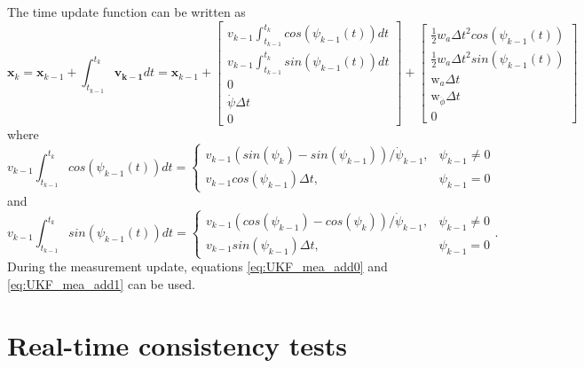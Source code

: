 \documentclass[12pt]{article}
\begin{document}
The time update function can be written as
\begin{equation}
	\mathbf{x}_{k} = 
	\mathbf{x}_{k-1} + \int_{t_{k-1}}^{t_k} {\mathbf{v_{k-1}}dt} 
	= \mathbf{x}_{k-1} + 
	\begin{bmatrix} 
		v_{k-1}\int_{t_{k-1}}^{t_k} cos(\psi_{k-1}(t))dt \\
		v_{k-1}\int_{t_{k-1}}^{t_k} sin(\psi_{k-1}(t)) dt \\ 
		0 \\ 
		\dot{\psi}\Delta t \\ 
		0 
	\end{bmatrix} +
	\begin{bmatrix} \frac{1}{2}w_a\Delta t^2cos(\psi_{k-1}(t)) \\
	                \frac{1}{2}w_a\Delta t^2sin(\psi_{k-1}(t)) \\
	                \text{w}_a\Delta t \\
	                \text{w}_{\ddot{\phi}} \Delta t \\
	                0
	                \end{bmatrix}
\end{equation}
%
where
%
\begin{equation}
	v_{k-1}\int_{t_{k-1}}^{t_k} cos(\psi_{k-1}(t)) dt =
	\begin{cases}
	  v_{k-1}(sin(\psi_k) - sin(\psi_{k-1}))/\dot{\psi}_{k-1}, & \psi_{k-1} \neq 0 \\
	  v_{k-1}cos(\psi_{k-1})\Delta t, &\psi_{k-1} = 0
	\end{cases}
\end{equation}
and
\begin{equation}
	v_{k-1}\int_{t_{k-1}}^{t_k} sin(\psi_{k-1}(t)) dt =
	\begin{cases}
	  v_{k-1}(cos(\psi_{k-1}) - cos(\psi_{k}))/\dot{\psi}_{k-1}, & \psi_{k-1} \neq 0 \\
	  v_{k-1}sin(\psi_{k-1})\Delta t, &\psi_{k-1} = 0
	\end{cases}.
\end{equation}
%
During the measurement update, equations \ref{eq:UKF_mea_add0} and \ref{eq:UKF_mea_add1} can be used.

%

\section{Real-time consistency tests}
\end{document}
